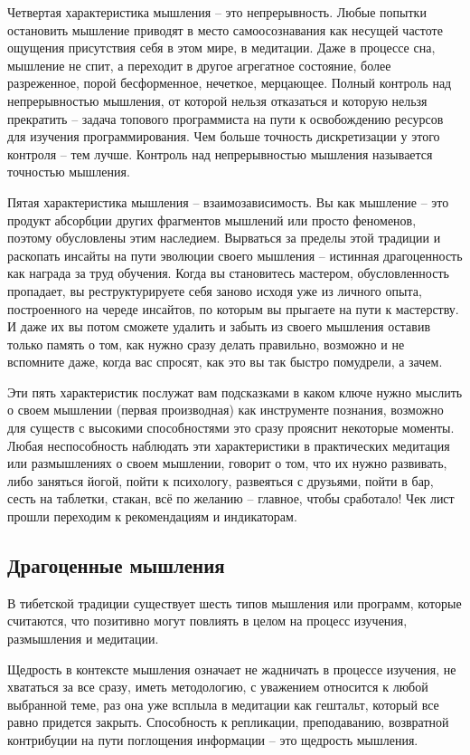Четвертая характеристика мышления – это непрерывность. Любые попытки остановить мышление приводят в место самоосознавания как несущей частоте ощущения присутствия себя в этом мире, в медитации. Даже в процессе сна, мышление не спит, а переходит в другое агрегатное состояние, более разреженное, порой бесформенное, нечеткое, мерцающее. Полный контроль над непрерывностью мышления, от которой нельзя отказаться и которую нельзя прекратить – задача топового программиста на пути к освобождению ресурсов для изучения программирования. Чем больше точность дискретизации у этого контроля – тем лучше. Контроль над непрерывностью мышления называется точностью мышления.

Пятая характеристика мышления – взаимозависимость. Вы как мышление – это продукт абсорбции других фрагментов мышлений или просто феноменов, поэтому обусловлены этим наследием. Вырваться за пределы этой традиции и раскопать инсайты на пути эволюции своего мышления – истинная драгоценность как награда за труд обучения. Когда вы становитесь мастером, обусловленность пропадает, вы реструктурируете себя заново исходя уже из личного опыта, построенного на череде инсайтов, по которым вы прыгаете на пути к мастерству. И даже их вы потом сможете удалить и забыть из своего мышления оставив только память о том, как нужно сразу делать правильно, возможно и не вспомните даже, когда вас спросят, как это вы так быстро помудрели, а зачем.

Эти пять характеристик послужат вам подсказками в каком ключе нужно мыслить о своем мышлении (первая производная) как инструменте познания, возможно для существ с высокими способностями это сразу прояснит некоторые моменты. Любая неспособность наблюдать эти характеристики в практических медитация или размышлениях о своем мышлении, говорит о том, что их нужно развивать, либо заняться йогой, пойти к психологу, развеяться с друзьями, пойти в бар, сесть на таблетки, стакан, всё по желанию – главное, чтобы сработало! Чек лист прошли переходим к рекомендациям и индикаторам.

\subsection{Драгоценные мышления}

В тибетской традиции существует шесть типов мышления или программ, которые считаются, что позитивно могут повлиять в целом на процесс изучения, размышления и медитации.

Щедрость в контексте мышления означает не жадничать в процессе изучения, не хвататься за все сразу, иметь методологию, с уважением относится к любой выбранной теме, раз она уже всплыла в медитации как гештальт, который все равно придется закрыть. Способность к репликации, преподаванию, возвратной контрибуции на пути поглощения информации – это щедрость мышления.

